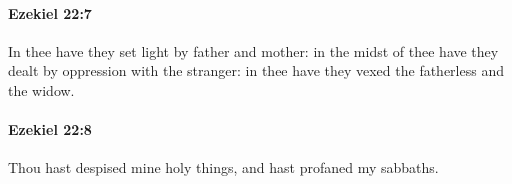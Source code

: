 		\paragraph{Ezekiel 22:7} %
			\label{EZEKIEL-22-7}

			In thee have they set light by father and mother: in the midst of thee have they dealt by oppression with the stranger: in thee have they vexed the fatherless and the widow.


		\paragraph{Ezekiel 22:8} %
			\label{EZEKIEL-22-8}

			Thou hast despised mine holy things, and hast profaned my sabbaths.


